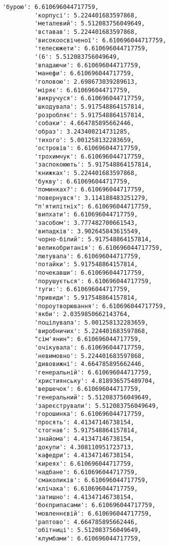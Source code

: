 \documentclass[11pt]{article}
\begin{document}
\begin{Verbatim}[commandchars=\\\{\}]
         'бурою': 6.610696044717759,
         'корпусі': 5.224401683597868,
         'металевий': 5.512083756049649,
         'вставав': 5.224401683597868,
         'високоосвіченої': 6.610696044717759,
         'телесюжети': 6.610696044717759,
         '(6': 5.512083756049649,
         'впадаючи': 6.610696044717759,
         'манефи': 6.610696044717759,
         'головою': 2.698673039289613,
         'міряє': 6.610696044717759,
         'викручуся': 6.610696044717759,
         'шкодувала': 5.917548864157814,
         'розробляє': 5.917548864157814,
         'собаки': 4.664785895662446,
         'образ': 3.243400214731285,
         'тихого': 5.001258132283659,
         'островів': 6.610696044717759,
         'трохимчук': 6.610696044717759,
         'заспокоюють': 5.917548864157814,
         'книжках': 5.224401683597868,
         'букву': 6.610696044717759,
         'поминках?': 6.610696044717759,
         'повернувся': 3.114188483251279,
         "п'ятилітніх": 6.610696044717759,
         'випхати': 6.610696044717759,
         'засобом': 3.777482700661543,
         'випадків': 3.902645843615549,
         'чорно-білий': 5.917548864157814,
         'великобританія': 6.610696044717759,
         'лютувала': 6.610696044717759,
         'потайки': 5.917548864157814,
         'почекавши': 6.610696044717759,
         'порушується': 6.610696044717759,
         'туги:': 6.610696044717759,
         'привиди': 5.917548864157814,
         'пороутворювання': 6.610696044717759,
         'якби': 2.0359850662143764,
         'поцілувала': 5.001258132283659,
         'виробничих': 5.224401683597868,
         "сім'янин": 6.610696044717759,
         'очікувала': 6.610696044717759,
         'невимовно': 5.224401683597868,
         'дивовижні': 4.664785895662446,
         'генеральній': 6.610696044717759,
         'християнську': 4.818936575489704,
         'вершечок': 6.610696044717759,
         'генеральний': 5.512083756049649,
         'зареєстрували': 5.512083756049649,
         'горошинка': 6.610696044717759,
         'просять': 4.41347146738154,
         'стогнав': 5.917548864157814,
         'знайома': 4.41347146738154,
         'докупи': 4.308110951723713,
         'кафедри': 4.41347146738154,
         'киреях': 6.610696044717759,
         'надбане': 6.610696044717759,
         'смаколиків': 6.610696044717759,
         'клічака': 6.610696044717759,
         'затишно': 4.41347146738154,
         'боєприпасами': 6.610696044717759,
         'мовленнєвій': 6.610696044717759,
         'раптово': 4.664785895662446,
         'обітниці': 5.512083756049649,
         'клумбами': 6.610696044717759,

\end{Verbatim}
\end{document}
